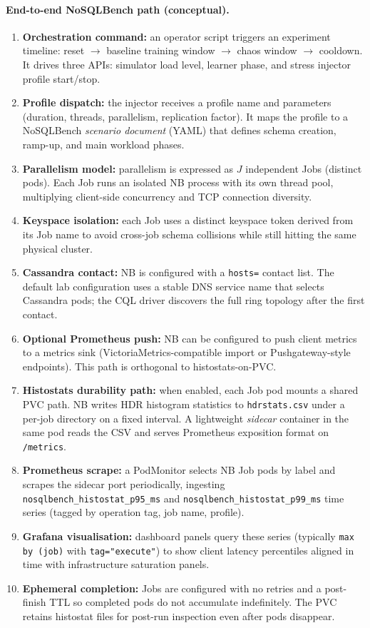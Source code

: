 \documentclass[sigconf]{acmart}
\begin{document}
\paragraph{End-to-end NoSQLBench path (conceptual).}
\begin{enumerate}
  \item \textbf{Orchestration command:} an operator script triggers an experiment timeline: reset $\rightarrow$ baseline training window $\rightarrow$ chaos window $\rightarrow$ cooldown. It drives three APIs: simulator load level, learner phase, and stress injector profile start/stop.
  \item \textbf{Profile dispatch:} the injector receives a profile name and parameters (duration, threads, parallelism, replication factor). It maps the profile to a NoSQLBench \emph{scenario document} (YAML) that defines schema creation, ramp-up, and main workload phases.
  \item \textbf{Parallelism model:} parallelism is expressed as $J$ independent Jobs (distinct pods). Each Job runs an isolated NB process with its own thread pool, multiplying client-side concurrency and TCP connection diversity.
  \item \textbf{Keyspace isolation:} each Job uses a distinct keyspace token derived from its Job name to avoid cross-job schema collisions while still hitting the same physical cluster.
  \item \textbf{Cassandra contact:} NB is configured with a \texttt{hosts=} contact list. The default lab configuration uses a stable DNS service name that selects Cassandra pods; the CQL driver discovers the full ring topology after the first contact.
  \item \textbf{Optional Prometheus push:} NB can be configured to push client metrics to a metrics sink (VictoriaMetrics-compatible import or Pushgateway-style endpoints). This path is orthogonal to histostats-on-PVC.
  \item \textbf{Histostats durability path:} when enabled, each Job pod mounts a shared PVC path. NB writes HDR histogram statistics to \texttt{hdrstats.csv} under a per-job directory on a fixed interval. A lightweight \emph{sidecar} container in the same pod reads the CSV and serves Prometheus exposition format on \texttt{/metrics}.
  \item \textbf{Prometheus scrape:} a PodMonitor selects NB Job pods by label and scrapes the sidecar port periodically, ingesting \texttt{nosqlbench\_histostat\_p95\_ms} and \texttt{nosqlbench\_histostat\_p99\_ms} time series (tagged by operation tag, job name, profile).
  \item \textbf{Grafana visualisation:} dashboard panels query these series (typically \texttt{max by (job)} with \texttt{tag="execute"}) to show client latency percentiles aligned in time with infrastructure saturation panels.
  \item \textbf{Ephemeral completion:} Jobs are configured with no retries and a post-finish TTL so completed pods do not accumulate indefinitely. The PVC retains histostat files for post-run inspection even after pods disappear.
\end{enumerate}
\end{document}
